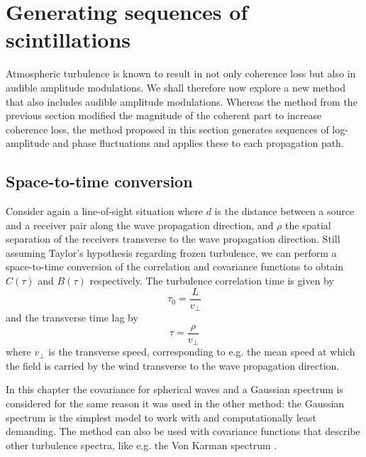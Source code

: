 \section{Generating sequences of scintillations}

Atmospheric turbulence is known to result in not only coherence loss but also in
audible amplitude modulations. We shall therefore now explore a new method that
also includes audible amplitude modulations. Whereas the method from the
previous section modified the magnitude of the coherent part to increase
coherence loss, the method proposed in this section generates sequences of
log-amplitude and phase fluctuations and applies these to each propagation path.

\subsection{Space-to-time conversion}

Consider again a line-of-sight situation where
$d$ is the distance between a source and a receiver pair along the wave
propagation direction, and $\rho$ the spatial separation of the receivers
transverse to the wave propagation direction.
Still assuming Taylor's hypothesis regarding frozen turbulence, we can perform a
space-to-time conversion of the correlation and covariance functions to obtain
$C(\tau)$ and $B(\tau)$ respectively. The turbulence correlation time is given
by
\begin{equation}
 \tau_0 = \frac{L}{v_{\bot}}
\end{equation}
and the transverse time lag by
\begin{equation}
  \tau = \frac{\rho}{v_{\bot}}
\end{equation}
where $v_{\bot}$ is the transverse speed, corresponding to e.g. the mean speed
at which the field is carried by the wind transverse to the wave propagation
direction.

In this chapter the covariance for spherical waves and a Gaussian spectrum is
considered for the same reason it was used in the other method: the Gaussian
spectrum is the simplest model to work with and computationally least demanding.
The method can also be used with covariance functions that describe other
turbulence spectra, like e.g. the Von Karman spectrum \cite{Ostashev2015}.

